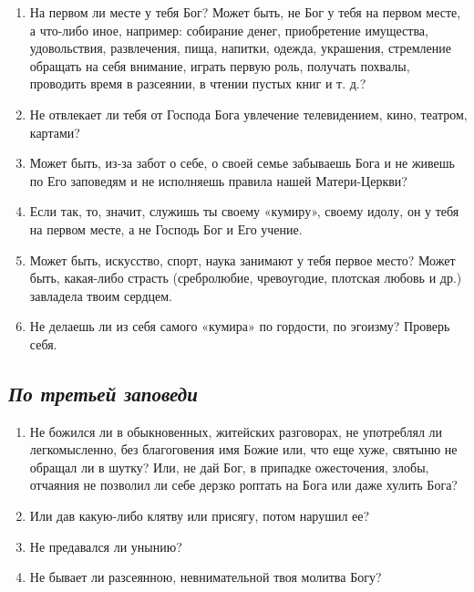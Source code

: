 \begin{enumerate}

\item На первом ли месте у тебя Бог? Может быть, не Бог у тебя на первом месте, а что-либо иное, например: собирание денег, приобретение имущества, удовольствия, развлечения, пища, напитки, одежда, украшения, стремление обращать на себя внимание, играть первую роль, получать похвалы, проводить время в разсеянии, в чтении пустых книг и т. д.?

\item Не отвлекает ли тебя от Господа Бога увлечение телевидением, кино, театром, картами?

\item Может быть, из-за забот о себе, о своей семье забываешь Бога и не живешь по Его заповедям и не исполняешь правила нашей Матери-Церкви?

\item Если так, то, значит, служишь ты своему «кумиру», своему идолу, он у тебя на первом месте, а не Господь Бог и Его учение.

\item Может быть, искусство, спорт, наука занимают у тебя первое место? Может быть, какая-либо страсть (сребролюбие, чревоугодие, плотская любовь и др.) завладела твоим сердцем.

\item Не делаешь ли из себя самого «кумира» по гордости, по эгоизму? Проверь себя. 
\end{enumerate}

\subsection*{\itshape По третьей заповеди}

\begin{enumerate}

\item Не божился ли в обыкновенных, житейских разговорах, не употреблял ли легкомысленно, без благоговения имя Божие или, что еще хуже, святыню не обращал ли в шутку? Или, не дай Бог, в припадке ожесточения, злобы, отчаяния не позволил ли себе дерзко роптать на Бога или даже хулить Бога?

\item Или дав какую-либо клятву или присягу, потом нарушил ее?

\item Не предавался ли унынию?

\item Не бывает ли разсеянною, невнимательной твоя молитва Богу? 
\end{enumerate}

